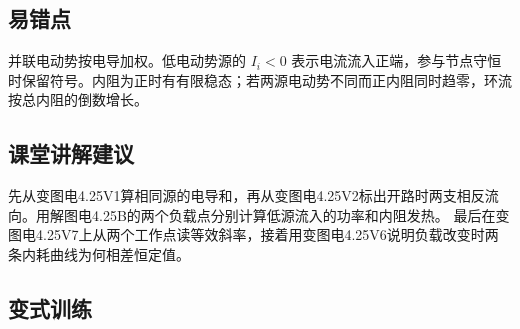 \documentclass[UTF8,fontset=fandol,a4paper,11pt]{ctexart}
\begin{document}


\subsection*{易错点}

并联电动势按电导加权。低电动势源的 $I_i<0$ 表示电流流入正端，参与节点守恒时保留符号。内阻为正时有有限稳态；若两源电动势不同而正内阻同时趋零，环流按总内阻的倒数增长。



\subsection*{课堂讲解建议}

先从变图电4.25V1算相同源的电导和，再从变图电4.25V2标出开路时两支相反流向。用解图电4.25B的两个负载点分别计算低源流入的功率和内阻发热。
最后在变图电4.25V7上从两个工作点读等效斜率，接着用变图电4.25V6说明负载改变时两条内耗曲线为何相差恒定值。


\subsection*{变式训练}
\end{document}
